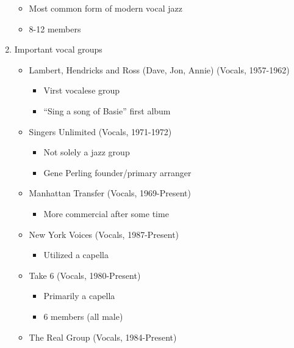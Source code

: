 \documentclass[]{article}
\providecommand{\tightlist}{%
  \setlength{\itemsep}{0pt}\setlength{\parskip}{0pt}}
\begin{document}
\begin{enumerate}
  \begin{itemize}
  \tightlist
  \item
    Most common form of modern vocal jazz
  \item
    8-12 members
  \end{itemize}
\item
  Important vocal groups

  \begin{itemize}
  \tightlist
  \item
    Lambert, Hendricks and Ross (Dave, Jon, Annie) (Vocals, 1957-1962)

    \begin{itemize}
    \tightlist
    \item
      Virst vocalese group
    \item
      ``Sing a song of Basie'' first album
    \end{itemize}
  \item
    Singers Unlimited (Vocals, 1971-1972)

    \begin{itemize}
    \tightlist
    \item
      Not solely a jazz group
    \item
      Gene Perling founder/primary arranger
    \end{itemize}
  \item
    Manhattan Transfer (Vocals, 1969-Present)

    \begin{itemize}
    \tightlist
    \item
      More commercial after some time
    \end{itemize}
  \item
    New York Voices (Vocals, 1987-Present)

    \begin{itemize}
    \tightlist
    \item
      Utilized a capella
    \end{itemize}
  \item
    Take 6 (Vocals, 1980-Present)

    \begin{itemize}
    \tightlist
    \item
      Primarily a capella
    \item
      6 members (all male)
    \end{itemize}
  \item
    The Real Group (Vocals, 1984-Present)


\end{itemize}
\end{enumerate}
\end{document}
